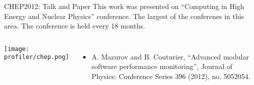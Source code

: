 \begin{frame}{CHEP2012: Talk and Paper}
This work was presented on ``Computing in High Energy and Nuclear Physics'' conference.
The largest of the conferenes in this area. The conference is held every 18 months.
\begin{columns}[l]
\texttt{[image: profiler/chep.png]}
\begin{itemize}
    \item A. Mazurov and B. Couturier, ``Advanced modular software performance monitoring'',
    Journal of Physics: Conference Series 396 (2012), no. 5052054.
\end{itemize}
\end{columns}
\end{frame}